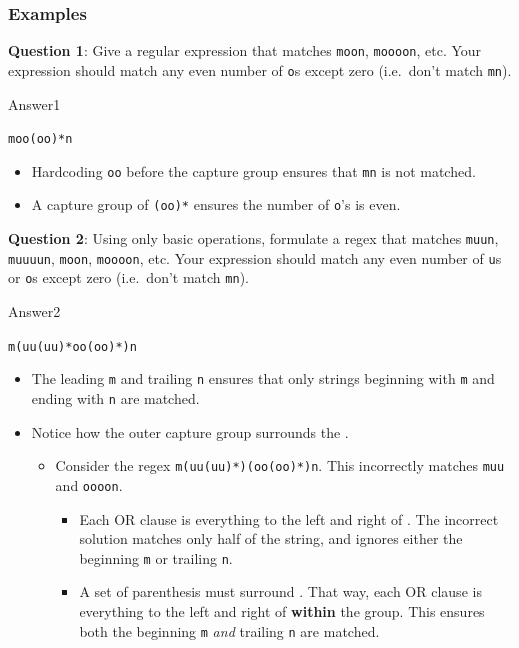 \documentclass[
  letterpaper,
  DIV=11,
  numbers=noendperiod]{scrreprt}
\providecommand{\tightlist}{%
  \setlength{\itemsep}{0pt}\setlength{\parskip}{0pt}}\usepackage{longtable,booktabs,array}
\begin{document}
\subsubsection{Examples}\label{examples}

\textbf{Question 1}: Give a regular expression that matches
\texttt{moon}, \texttt{moooon}, etc. Your expression should match any
even number of \texttt{o}s except zero (i.e.~don't match \texttt{mn}).

Answer1

\texttt{moo(oo)*n}

\begin{itemize}
\tightlist
\item
  Hardcoding \texttt{oo} before the capture group ensures that
  \texttt{mn} is not matched.
\item
  A capture group of \texttt{(oo)*} ensures the number of \texttt{o}'s
  is even.
\end{itemize}

\textbf{Question 2}: Using only basic operations, formulate a regex that
matches \texttt{muun}, \texttt{muuuun}, \texttt{moon}, \texttt{moooon},
etc. Your expression should match any even number of \texttt{u}s or
\texttt{o}s except zero (i.e.~don't match \texttt{mn}).

Answer2

\texttt{m(uu(uu)*\textbar{}oo(oo)*)n}

\begin{itemize}
\tightlist
\item
  The leading \texttt{m} and trailing \texttt{n} ensures that only
  strings beginning with \texttt{m} and ending with \texttt{n} are
  matched.
\item
  Notice how the outer capture group surrounds the \texttt{\textbar{}}.

  \begin{itemize}
  \tightlist
  \item
    Consider the regex \texttt{m(uu(uu)*)\textbar{}(oo(oo)*)n}. This
    incorrectly matches \texttt{muu} and \texttt{oooon}.

    \begin{itemize}
    \tightlist
    \item
      Each OR clause is everything to the left and right of
      \texttt{\textbar{}}. The incorrect solution matches only half of
      the string, and ignores either the beginning \texttt{m} or
      trailing \texttt{n}.
    \item
      A set of parenthesis must surround \texttt{\textbar{}}. That way,
      each OR clause is everything to the left and right of
      \texttt{\textbar{}} \textbf{within} the group. This ensures both
      the beginning \texttt{m} \emph{and} trailing \texttt{n} are
      matched.
    \end{itemize}
  \end{itemize}
\end{itemize}
\end{document}
